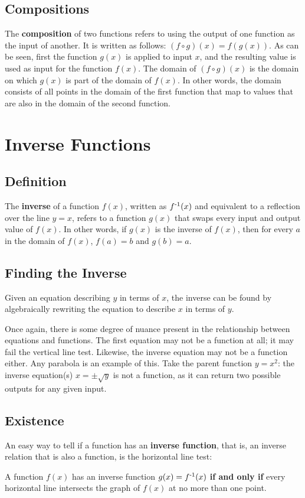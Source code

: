 \documentclass[11pt]{article}
\begin{document}
\subsection{Compositions}
The \textbf{composition} of two functions refers to using the output of one function as the input of another. It is written as follows: $(f \circ g)(x) = f(g(x))$. As can be seen, first the function $g(x)$ is applied to input $x$, and the resulting value is used as input for the function $f(x)$. The domain of $(f \circ g)(x)$ is the domain on which $g(x)$ is part of the domain of $f(x)$. In other words, the domain consists of all points in the domain of the first function that map to values that are also in the domain of the second function.

\section{Inverse Functions}

\subsection{Definition}
The \textbf{inverse} of a function $f(x)$, written as $f \textsuperscript{-1} (x)$ and equivalent to a reflection over the line $y=x$, refers to a function $g(x)$ that swaps every input and output value of $f(x)$. In other words, if $g(x)$ is the inverse of $f(x)$, then for every $a$ in the domain of $f(x)$, $f(a) = b$ and $g(b) = a$. 

\subsection{Finding the Inverse}
Given an equation describing $y$ in terms of $x$, the inverse can be found by algebraically rewriting the equation to describe $x$ in terms of $y$. 

Once again, there is some degree of nuance present in the relationship between equations and functions. The first equation may not be a function at all; it may fail the vertical line test. Likewise, the inverse equation may not be a function either. Any parabola is an example of this. Take the parent function $y=x^2$: the inverse equation(s) $x=\pm \sqrt{y}$ is not a function, as it can return two possible outputs for any given input.

\subsection{Existence}

An easy way to tell if a function has an \textbf{inverse function}, that is, an inverse relation that is also a function, is the horizontal line test:

A function $f(x)$ has an inverse function $g(x)=f \textsuperscript{-1} (x)$ \textbf{if and only if} every horizontal line intersects the graph of $f(x)$ at no more than one point. 
\end{document}
